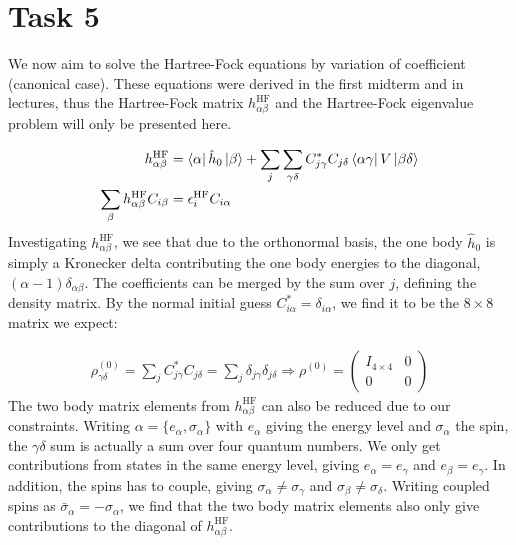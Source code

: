 \documentclass{article}
\newcommand{\inner}[3]{\bra{#1}#2\ket{#3}}
\newcommand{\set}[1]{\{ #1 \}}
\newcommand{\hatreefock}[1]{#1^{\text{HF}}}
\begin{document}
\section*{Task 5}
    We now aim to solve the Hartree-Fock equations by variation of coefficient (canonical case). These equations were derived in the first midterm and in lectures, thus the Hartree-Fock matrix $\hatreefock{h}_{\alpha\beta}$ and the Hartree-Fock eigenvalue problem will only be presented here.

    \begin{align*}
        \hatreefock{h}_{\alpha\beta} &= \inner{\alpha}{\hat{h}_0}{\beta} + \sum_j \sum_{\gamma\delta} C_{j\gamma}^* C_{j\delta} \inner{\alpha\gamma}{V}{\beta\delta}  \\
        \sum_\beta \hatreefock{h}_{\alpha\beta}C_{i\beta} &= \hatreefock{\epsilon}_i C_{i\alpha}   
    \end{align*}
    Investigating $\hatreefock{h}_{\alpha\beta}$, we see that due to the orthonormal basis, the one body $\hat{h}_0$ is simply a Kronecker delta contributing the one body energies to the diagonal, $(\alpha-1)\delta_{\alpha\beta}$. The coefficients can be merged by the sum over $j$, defining the density matrix. By the normal initial guess $C_{i\alpha}^* = \delta_{i\alpha}$, we find it to be the $8 \times 8$ matrix we expect:
    
    \begin{align*}
        \rho_{\gamma\delta}^{(0)} = \sum_j C_{j\gamma}^* C_{j\delta} = \sum_j \delta_{j\gamma}\delta_{j\delta} \Rightarrow \rho^{(0)} = \begin{pmatrix}
            I_{4 \times 4} & 0 \\
            0 & 0 
        \end{pmatrix}
    \end{align*}
    The two body matrix elements from $\hatreefock{h}_{\alpha\beta}$ can also be reduced due to our constraints. Writing $\alpha = \set{e_\alpha, \sigma_\alpha}$ with $e_\alpha$ giving the energy level and $\sigma_\alpha$ the spin, the $\gamma\delta$ sum is actually a sum over four quantum numbers. We only get contributions from states in the same energy level, giving $e_\alpha = e_\gamma$ and $e_\beta = e_\gamma$. In addition, the spins has to couple, giving $\sigma_\alpha \neq \sigma_\gamma$ and $\sigma_\beta \neq \sigma_\delta$. Writing coupled spins as $\bar{\sigma}_\alpha = -\sigma_\alpha$, we find that the two body matrix elements also only give contributions to the diagonal of $\hatreefock{h}_{\alpha\beta}$. 
\end{document}
